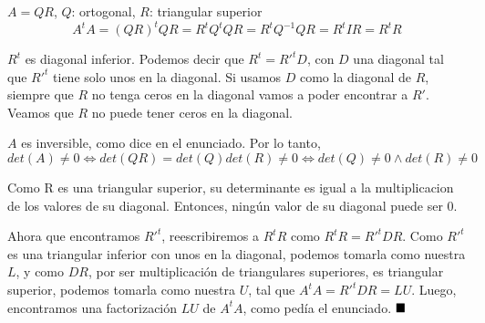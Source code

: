 \documentclass{amsart}
\begin{document}
$A = QR$, $Q$: ortogonal, $R$: triangular superior
\[
    A^tA = (QR)^t QR = R^tQ^tQR = R^tQ^{-1}QR = R^tIR = R^tR
\]

$R^t$ es diagonal inferior. Podemos decir que $R^t = R'^tD$,
con $D$ una diagonal tal que $R'^t$ tiene solo unos en la
diagonal. Si usamos $D$ como la diagonal de $R$, siempre
que $R$ no tenga ceros en la diagonal vamos
a poder encontrar a $R'$. Veamos que $R$ no puede tener ceros
en la diagonal.

$A$ es inversible, como dice en el enunciado. Por lo tanto,
\[
    det(A) \neq 0 \iff det(QR) = det(Q)det(R) \neq 0
    \iff det(Q) \neq 0 \land det(R) \neq 0
\]

Como R es una triangular superior, su determinante es igual
a la multiplicacion de los valores de su diagonal. Entonces,
ningún valor de su diagonal puede ser 0.

Ahora que encontramos $R'^t$, reescribiremos a $R^tR$ como
\(
    R^tR = R'^tDR
\). Como $R'^t$ es una triangular inferior con unos en la
diagonal, podemos tomarla como nuestra $L$, y como $DR$,
por ser multiplicación de triangulares superiores,
es triangular superior, podemos tomarla como nuestra $U$,
tal que $A^tA = R'^tDR = LU$. Luego, encontramos una
factorización $LU$ de $A^tA$, como pedía el enunciado.
$\hfill\blacksquare$
\end{document}
